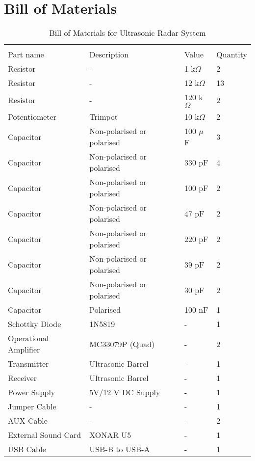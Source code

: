 \documentclass[class=report,11pt,crop=false]{standalone}
\begin{document}
\chapter{Bill of Materials\label{sect:bill-of-materials}}
\begin{table}[htbp]
\centering
\caption{\label{tab:Table 2} Bill of Materials for Ultrasonic Radar System}
\vspace{-0.5cm}
\begin{tabular}{|m{7em}|m{10em}|m{7em}|m{7em}|}
\multicolumn{4}{l}{}\\
\cline{1-4}
Part name & Description & Value & Quantity\\\cline{1-4}
Resistor & - & 1 k$\Omega$ & 2  \\\cline{1-4}
Resistor & - & 12 k$\Omega$ & 13  \\\cline{1-4}
Resistor & - & 120 k$\Omega$ & 2  \\\cline{1-4}
Potentiometer & Trimpot & 10 k$\Omega$ & 2 \\\cline{1-4}
Capacitor & Non-polarised or polarised & 100 $\mu$F & 3  \\\cline{1-4}
Capacitor &Non-polarised or polarised & 330 pF & 4 \\\cline{1-4}
Capacitor &Non-polarised or polarised & 100 pF & 2\\\cline{1-4}
Capacitor &Non-polarised or polarised & 47 pF & 2 \\\cline{1-4}
Capacitor &Non-polarised or polarised & 220 pF & 2 \\\cline{1-4}
Capacitor &Non-polarised or polarised & 39 pF & 2 \\\cline{1-4}
Capacitor &Non-polarised or polarised & 30 pF & 2 \\\cline{1-4}
Capacitor & Polarised & 100 nF & 1  \\\cline{1-4}
Schottky Diode & 1N5819 & - & 1  \\\cline{1-4}
Operational Amplifier & MC33079P (Quad) & - & 2  \\\cline{1-4}
Transmitter & Ultrasonic Barrel  & - & 1  \\\cline{1-4}
Receiver & Ultrasonic Barrel & - & 1 \\\cline{1-4}
Power Supply & 5V/12 V DC Supply & - & 1  \\\cline{1-4}
Jumper Cable & -& - & 1 \\\cline{1-4}
AUX Cable & -& - & 2  \\\cline{1-4}
External Sound Card & XONAR U5 & - & 1  \\\cline{1-4}
USB Cable & USB-B to USB-A & - & 1 \\\cline{1-4}
\end{tabular}
\end{table}
\ifstandalone
% 
\fi
\end{document}

